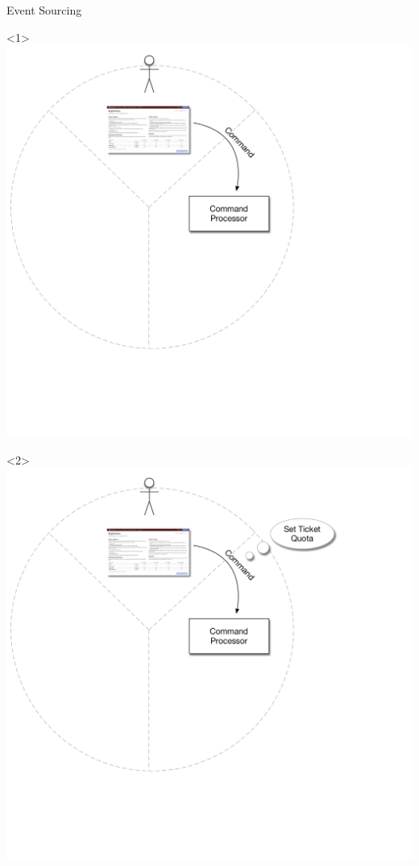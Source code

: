 \begin{frame}[fragile]{Event Sourcing}

\renewcommand{\WIDTH}{.7\textwidth}

\begin{onlyenv}<1>
\includegraphics[width=\WIDTH]{../EventSourcing1.pdf} %
\end{onlyenv}
\begin{onlyenv}<2>
\includegraphics[width=\WIDTH]{../EventSourcing1_1.pdf} %

\end{onlyenv}
\end{frame}
